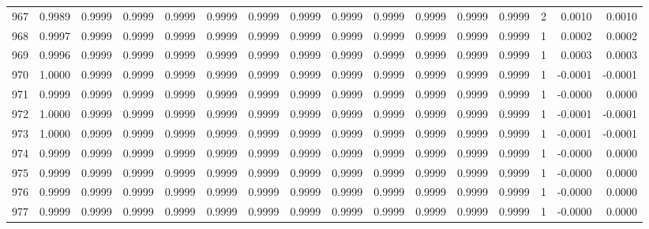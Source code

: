 \begin{tabular}{lrrrrrrrrrrrrrrr}
967 &      0.9989 &  0.9999 &  0.9999 &  0.9999 &  0.9999 &  0.9999 &  0.9999 &  0.9999 &  0.9999 &  0.9999 &   0.9999 &     0.9999 &      2 &                    0.0010 &                     0.0010 \\
968 &      0.9997 &  0.9999 &  0.9999 &  0.9999 &  0.9999 &  0.9999 &  0.9999 &  0.9999 &  0.9999 &  0.9999 &   0.9999 &     0.9999 &      1 &                    0.0002 &                     0.0002 \\
969 &      0.9996 &  0.9999 &  0.9999 &  0.9999 &  0.9999 &  0.9999 &  0.9999 &  0.9999 &  0.9999 &  0.9999 &   0.9999 &     0.9999 &      1 &                    0.0003 &                     0.0003 \\
970 &      1.0000 &  0.9999 &  0.9999 &  0.9999 &  0.9999 &  0.9999 &  0.9999 &  0.9999 &  0.9999 &  0.9999 &   0.9999 &     0.9999 &      1 &                   -0.0001 &                    -0.0001 \\
971 &      0.9999 &  0.9999 &  0.9999 &  0.9999 &  0.9999 &  0.9999 &  0.9999 &  0.9999 &  0.9999 &  0.9999 &   0.9999 &     0.9999 &      1 &                   -0.0000 &                     0.0000 \\
972 &      1.0000 &  0.9999 &  0.9999 &  0.9999 &  0.9999 &  0.9999 &  0.9999 &  0.9999 &  0.9999 &  0.9999 &   0.9999 &     0.9999 &      1 &                   -0.0001 &                    -0.0001 \\
973 &      1.0000 &  0.9999 &  0.9999 &  0.9999 &  0.9999 &  0.9999 &  0.9999 &  0.9999 &  0.9999 &  0.9999 &   0.9999 &     0.9999 &      1 &                   -0.0001 &                    -0.0001 \\
974 &      0.9999 &  0.9999 &  0.9999 &  0.9999 &  0.9999 &  0.9999 &  0.9999 &  0.9999 &  0.9999 &  0.9999 &   0.9999 &     0.9999 &      1 &                   -0.0000 &                     0.0000 \\
975 &      0.9999 &  0.9999 &  0.9999 &  0.9999 &  0.9999 &  0.9999 &  0.9999 &  0.9999 &  0.9999 &  0.9999 &   0.9999 &     0.9999 &      1 &                   -0.0000 &                     0.0000 \\
976 &      0.9999 &  0.9999 &  0.9999 &  0.9999 &  0.9999 &  0.9999 &  0.9999 &  0.9999 &  0.9999 &  0.9999 &   0.9999 &     0.9999 &      1 &                   -0.0000 &                     0.0000 \\
977 &      0.9999 &  0.9999 &  0.9999 &  0.9999 &  0.9999 &  0.9999 &  0.9999 &  0.9999 &  0.9999 &  0.9999 &   0.9999 &     0.9999 &      1 &                   -0.0000 &                     0.0000 \\

\end{tabular}
